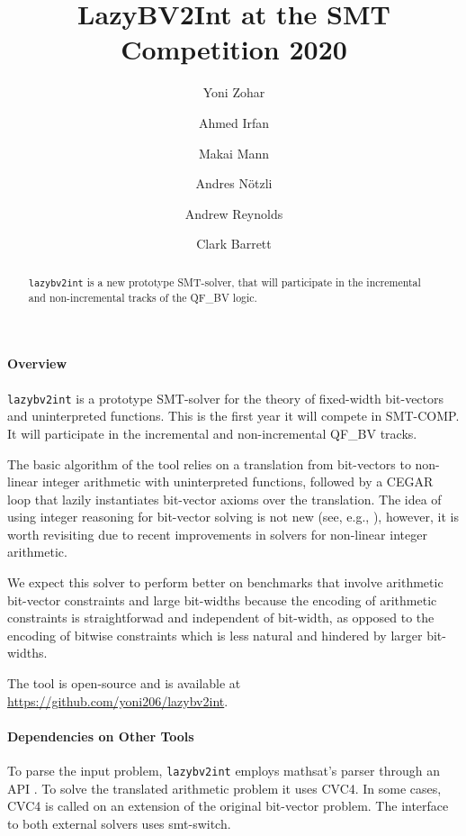 \documentclass{easychair}
\newcommand{\lazybvtoint}{\texttt{lazybv2int}\xspace}
\newcommand{\smtcomp}{SMT-COMP\xspace}
\newcommand{\qfbv}{QF\_BV\xspace}
\newcommand{\msat}{mathsat\xspace}
\newcommand{\cvcfour}{CVC4\xspace}
\newcommand{\smtswitch}{smt-switch\xspace}
\begin{document}
\author{
		Yoni Zohar\and
		Ahmed Irfan \and
		Makai Mann \and
		Andres N\"otzli \and
		Andrew Reynolds\and
		Clark Barrett
}

\title{LazyBV2Int at the SMT Competition 2020}

\maketitle


\noindent
\begin{abstract}
\lazybvtoint is a new prototype SMT-solver, that  will participate in the incremental and non-incremental tracks of the \qfbv logic.
\end{abstract}

\paragraph{Overview}
\lazybvtoint is a prototype SMT-solver for the theory of fixed-width bit-vectors and uninterpreted functions.
This is the first year it will compete in \smtcomp.
It will participate in the incremental and non-incremental \qfbv tracks.

The basic algorithm of the tool relies on a translation from bit-vectors to
non-linear integer arithmetic with uninterpreted functions, followed by
a CEGAR loop \cite{cegar} that lazily instantiates bit-vector axioms over the translation.
The idea of using integer reasoning for bit-vector solving is not new (see,
e.g., \cite{}), however, it is worth revisiting due to recent improvements in solvers for non-linear integer arithmetic.

We expect this solver to perform better on benchmarks that involve arithmetic
bit-vector constraints and large bit-widths because the encoding of arithmetic
constraints is straightforwad and independent of bit-width, as opposed to the
encoding of bitwise constraints which is less natural and hindered by larger
bit-widths.

The tool is open-source and is available at \url{https://github.com/yoni206/lazybv2int}.

\paragraph{Dependencies on Other Tools}
%
To parse the input problem, \lazybvtoint employs \msat's
parser through an API \cite{mathsat5}.
To solve the translated arithmetic problem it uses \cvcfour \cite{cvc4}.
In some cases, \cvcfour is called on an extension of the original bit-vector problem.
%
The interface to both external solvers uses
\smtswitch \cite{smtswitchgithub}.
\end{document}
